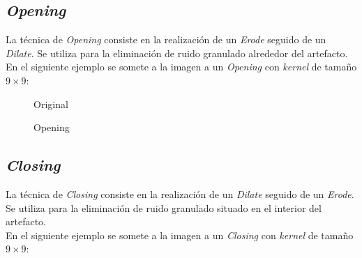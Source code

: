 \subsection{\emph{Opening}}
La técnica de \emph{Opening} consiste en la realización de un
\emph{Erode} seguido de un \emph{Dilate}. Se utiliza para la
eliminación de ruido granulado alrededor del artefacto.\\
En el siguiente ejemplo se somete a la imagen a un \emph{Opening} con
\emph{kernel} de tamaño $9 \times 9$:

\begin{figure}[H]
  \caption{Original}
  \centering \setlength\fboxsep{0pt} \setlength\fboxrule{0.5pt}
\end{figure}

\begin{figure}[H]
  \centering \setlength\fboxsep{0pt} \setlength\fboxrule{0.5pt}
  \caption{Opening}
\end{figure}

\subsection{\emph{Closing}}
La técnica de \emph{Closing} consiste en la realización de un
\emph{Dilate} seguido de un \emph{Erode}. Se utiliza para la
eliminación de ruido granulado situado en el interior del
artefacto. \\
En el siguiente ejemplo se somete a la imagen a un \emph{Closing} con
\emph{kernel} de tamaño $9 \times 9$:

